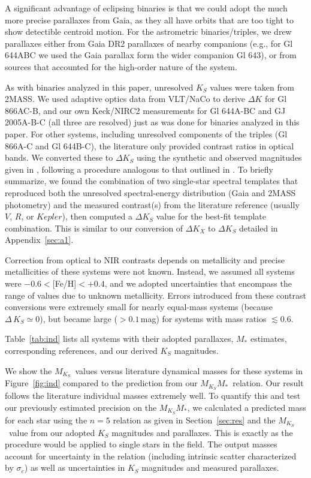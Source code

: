 \documentclass[twocolumn]{aastex62}
\newcommand{\mks}{$M_{K_S}$}
\newcommand{\mmk}{$M_{K_S}$\textendash$M_*$}
\begin{document}
A significant advantage of eclipsing binaries is that we could adopt the much more precise parallaxes from Gaia, as they all have orbits that are too tight to show detectible centroid motion. For the astrometric binaries/triples, we drew parallaxes either from Gaia DR2 parallaxes of nearby companions (e.g., for Gl 644ABC we used the Gaia parallax form the wider companion Gl 643), or from sources that accounted for the high-order nature of the system. 

As with binaries analyzed in this paper, unresolved $K_S$ values were taken from 2MASS. We used adaptive optics data from VLT/NaCo to derive $\Delta K$ for Gl 866AC-B, and our own Keck/NIRC2 measurements for Gl 644A-BC and GJ 2005A-B-C (all three are resolved) just as was done for binaries analyzed in this paper. For other systems, including unresolved components of the triples (Gl 866A-C and Gl 644B-C), the literature only provided contrast ratios in optical bands. We converted these to $\Delta K_S$ using the synthetic and observed magnitudes given in \citet{Mann2015b}, following a procedure analogous to that outlined in \citep{2017ApJ...845...72K}. To briefly summarize, we found the combination of two single-star spectral templates that reproduced both the unresolved spectral-energy distribution (Gaia and 2MASS photometry) and the measured contrast(s) from the literature reference (usually $V$, $R$, or $Kepler$), then computed a $\Delta K_S$ value for the best-fit template combination. This is similar to our conversion of $\Delta K_X$ to $\Delta K_S$ detailed in Appendix~\ref{sec:a1}. 

Correction from optical to NIR contrasts depends on metallicity \citep[e.g., ][]{Schlaufman2010} and precise metallicities of these systems were not known. Instead, we assumed all systems were $-0.6<$[Fe/H]$<+0.4$, and we adopted uncertainties that encompass the range of values due to unknown metallicity. Errors introduced from these contrast conversions were extremely small for nearly equal-mass systems (because $\Delta\,K_S\simeq0$), but became large ($>0.1$\,mag) for systems with mass ratios $\lesssim$0.6. 

Table~\ref{tab:ind} lists all systems with their adopted parallaxes, $M_*$ estimates, corresponding references, and our derived $K_S$ magnitudes.

We show the \mks\ values versus literature dynamical masses for these systems in Figure~\ref{fig:ind} compared to the prediction from our \mmk\ relation. Our result follows the literature individual masses extremely well. To quantify this and test our previously estimated precision on the \mmk, we calculated a predicted mass for each star using the $n=5$ relation as given in Section~\ref{sec:res} and the \mks\ value from our adopted $K_S$ magnitudes and parallaxes. This is exactly as the procedure would be applied to single stars in the field. The output masses account for uncertainty in the relation (including intrinsic scatter characterized by $\sigma_e$) as well as uncertainties in $K_S$ magnitudes and measured parallaxes. 
\end{document}
